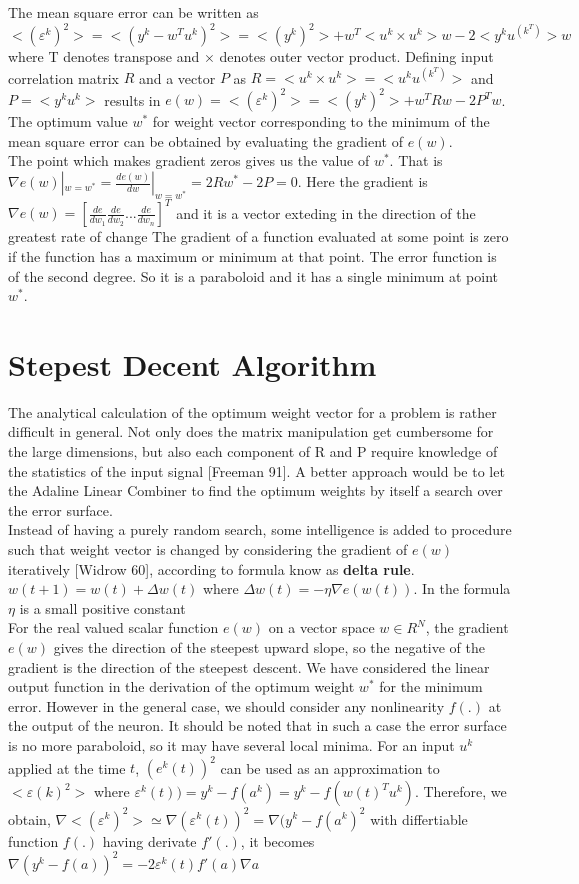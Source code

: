 \documentclass[12pt, a4paper, twoside]{book}
\begin{document}
The mean square error can be written as $<(\varepsilon^k)^2> = <(y^k - w^Tu^k)^2> = <(y^k)^2> + w^T <u^k\times u^k> w - 2 <y^ku^(k^T)> w$ where T denotes transpose and $\times$ denotes outer vector product.
Defining input correlation matrix $R$ and a vector $P$ as $R = <u^k\times u^k> = <u^ku^(k^T)>$ and $P = <y^ku^k>$ results in $e(w)=<(\varepsilon^k)^2> = <(y^k)^2> + w^TRw - 2P^Tw$. 
The optimum value $w^*$ for weight vector corresponding to the minimum of the mean square error can be obtained by evaluating the gradient of $e(w)$. \\

The point which makes gradient zeros gives us the value of $w^*$. That is 
$\nabla e(w)|_{w=w^*} = \frac{d e(w)}{d w}|_{w=w^*} = 2Rw^* - 2P = 0 $. Here the gradient is $\nabla e(w) = [ \frac{d e}{ d w_1} \frac{d e}{ d w_2} ... \frac{d e}{ d w_n} ]^T$ and it is a vector exteding in the direction of the greatest rate of change
The gradient of a function evaluated at some point is zero if the function has a maximum or minimum at that point. 
The error function is of the second degree. So it is a paraboloid and it has a single minimum at point $w^*$.

\section{Stepest Decent Algorithm}
The analytical calculation of the optimum weight vector for a problem is rather difficult in general. Not only does the matrix manipulation get cumbersome for the large dimensions, but also
each component of R and P require knowledge of the statistics of the input signal [Freeman 91]. A better approach would be to let the Adaline Linear Combiner to find the optimum weights by itself a search over the error surface. \\

Instead of having a purely random search, some intelligence is added to procedure such that weight vector is changed by considering the gradient of $e(w)$ iteratively [Widrow 60], according to formula know as \textbf{delta rule}. $w(t+1)=w(t)+\Delta w(t)$ where $\Delta w(t) = - \eta\nabla e(w(t)) $. In the formula $\eta$ is a small positive constant \\

For the real valued scalar function $e(w)$ on a vector space $w \in R^N$, the gradient $e(w)$ gives the direction of the steepest upward slope, so the negative of the gradient is the direction of the steepest descent. 
We have considered the linear output function in the derivation of the optimum weight $w^*$ for the minimum error. However in the general case, we should consider any nonlinearity $f(.)$ at the output of the neuron.
It should be noted that in such a case the error surface is no more paraboloid, so it may have several local minima.
For an input $u^k$ applied at the time $t$, $(e^k(t))^2$ can be used as an approximation to $<\varepsilon(k)^2>$ where $\varepsilon^k(t))=y^k - f(a^k) = y^k - f(w(t)^Tu^k)$. Therefore, we obtain, $\nabla <(\varepsilon^k)^2 > \simeq \nabla(\varepsilon^k(t))^2 = \nabla(y^k - f(a^k)^2$ with differtiable function $f(.)$ having derivate $f'(.)$, it becomes $\nabla(y^k-f(a))^2= -2\varepsilon^k(t)f'(a)\nabla a$ \\
\end{document}
